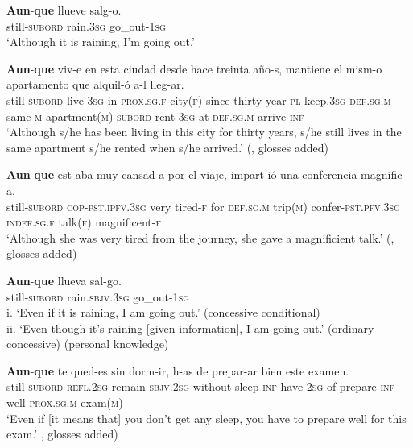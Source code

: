 \begin{exe}
	\ex\label{exAppendixSpanishAunqueConcessive1}
	\gll \textbf{Aun}-\textbf{que} llueve salg-o.\\
	still-\textsc{subord} rain.3\textsc{sg} go\_out-1\textsc{sg}\\
	\glt \lq Although it is raining, I'm going out.' \parencite[589]{HaspelmathKoenig1998}

	\ex\label{exAppendixSpanishAunqueConcessive2}
	\gll \textbf{Aun}-\textbf{que} viv-e en esta ciudad {desde hace} treinta año-s, mantiene el mism-o apartamento que alquil-ó a-l lleg-ar.\\
	still-\textsc{subord} live-3\textsc{sg} in \textsc{prox}.\textsc{sg}.\textsc{f} city(\textsc{f}) since thirty year-\textsc{pl} keep.3\textsc{sg} \textsc{def}.\textsc{sg}.\textsc{m} same-\textsc{m} apartment(\textsc{m}) \textsc{subord} rent-3\textsc{sg} at-\textsc{def}.\textsc{sg}.\textsc{m} arrive-\textsc{inf}\\
	\glt \lq Although s/he has been living in this city for thirty years, s/he still lives in the same apartment s/he rented when s/he arrived.' (\cite[§47.12a]{RAEGramatica}, glosses added)

	\ex\label{exAppendixSpanishAunqueConcessive3}
	\gll \textbf{Aun}-\textbf{que} est-aba muy cansad-a por el viaje, impart-ió una conferencia magnífic-a.\\
	still-\textsc{subord} \textsc{cop}-\textsc{pst}.\textsc{ipfv}.3\textsc{sg} very tired-\textsc{f} for \textsc{def}.\textsc{sg}.\textsc{m} trip(\textsc{m}) confer-\textsc{pst}.\textsc{pfv}.3\textsc{sg} \textsc{indef}.\textsc{sg}.\textsc{f} talk(\textsc{f}) magnificent-\textsc{f}\\
	\glt \lq Although she was very tired from the journey, she gave a magnificient talk.' (\cite[§47.12c]{RAEGramatica}, glosses added)

	\ex\label{exAppendixSpanishAunqueScalarConcessiveConditional1}
	\gll \textbf{Aun}-\textbf{que} llueva sal-go.\\
	still-\textsc{subord} rain.\textsc{sbjv}.3\textsc{sg} go\_out-1\textsc{sg}\\
	\glt \phantom{i}i. \lq Even if it is raining, I am going out.' (concessive conditional)\\
	ii. \lq Even though it's raining [given information], I am going out.' (ordinary concessive) (personal knowledge)
	
	\ex\label{exAppendixSpanishAunqueScalarConcessiveConditional2}
	\gll \textbf{Aun}-\textbf{que} te qued-es sin dorm-ir, h-as de prepar-ar bien este examen.\\
still-\textsc{subord} \textsc{refl}.2\textsc{sg} remain-\textsc{sbjv}.2\textsc{sg} without sleep-\textsc{inf}	 have-2\textsc{sg} of prepare-\textsc{inf} well \textsc{prox}.\textsc{sg}.\textsc{m} exam(\textsc{m})\\
\glt \lq Even if [it means that] you don't get any sleep, you have to prepare well for this exam.' \cite[§47.12e]{RAEGramatica}, glosses added)
	

\end{exe}
